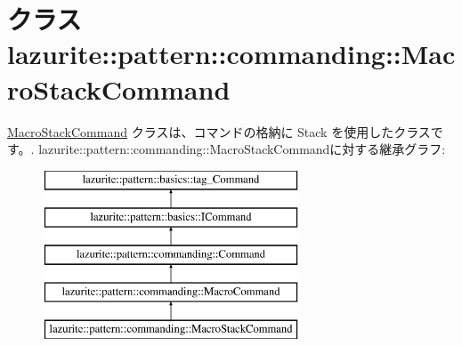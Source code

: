 \hypertarget{classlazurite_1_1pattern_1_1commanding_1_1_macro_stack_command}{
\section{クラス lazurite::pattern::commanding::MacroStackCommand}
\label{classlazurite_1_1pattern_1_1commanding_1_1_macro_stack_command}
}


\hyperlink{classlazurite_1_1pattern_1_1commanding_1_1_macro_stack_command}{MacroStackCommand} クラスは、コマンドの格納に Stack を使用したクラスです。.  
lazurite::pattern::commanding::MacroStackCommandに対する継承グラフ:\begin{figure}[H]
\begin{center}
\leavevmode
\includegraphics[height=5cm]{classlazurite_1_1pattern_1_1commanding_1_1_macro_stack_command}
\end{center}
\end{figure}
